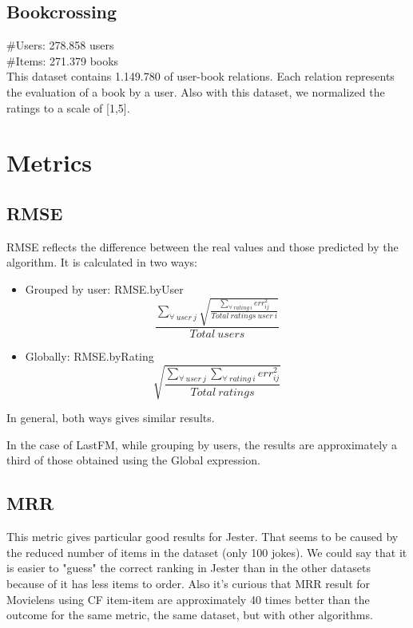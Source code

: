 \documentclass[a4paper]{article}
\begin{document}
\subsection{Bookcrossing}
\#Users: 278.858 users \\
\#Items: 271.379 books \\
This dataset contains 1.149.780 of user-book relations. Each relation represents the evaluation of a book by a user. Also with this dataset, we normalized the ratings to a scale of [1,5].

\section{Metrics}
\subsection{RMSE}
RMSE reflects the difference between the real values and those predicted by the algorithm.
It is calculated in two ways:
\begin{itemize}
	\item Grouped by user: RMSE.byUser
	\begin{equation}
		\frac{\displaystyle\sum_{\forall\ user\ j}\sqrt{\frac{\displaystyle\sum_{\forall\ rating\ i} err_{ij}^2}{Total\ ratings\ user\ i}}}{Total\ users}
    \end{equation}
    \item Globally: RMSE.byRating 
	\begin{equation}
		\sqrt{\frac{\displaystyle\sum_{\forall\ user\ j}\displaystyle\sum_{\forall\ rating\ i} err_{ij}^2}{Total\ ratings}}
    \end{equation}
\end {itemize}

In general, both ways gives similar results.

In the case of LastFM, while grouping by users, the results are approximately a third of those obtained using the Global expression.


\subsection{MRR}
This metric gives particular good results for Jester. That seems to be caused by the reduced number of items in the dataset (only 100 jokes). We could say that it is easier to "guess" the correct ranking in Jester than in the other datasets because of it has less items to order.
Also it's curious that MRR result for Movielens using CF item-item are approximately 40 times better than the outcome for the same metric, the same dataset, but with other algorithms.
\end{document}
